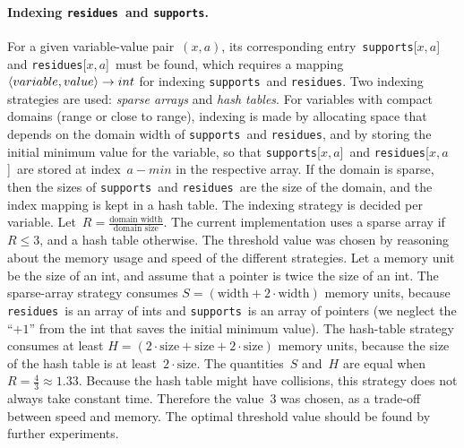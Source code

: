 \documentclass[a4paper,11pt]{article}
\newcommand{\Todo}[1]{{\color{blue}#1}}
\newcommand{\CurrTable}{\texttt{validTuples}}
\newcommand{\Supports}{\texttt{supports}}
\newcommand{\Residues}{\texttt{residues}}
\numberwithin{equation}{section}
\begin{document}
\paragraph{Indexing \Residues~and \Supports.}
For a given variable-value pair~$(x,a)$, its corresponding entry~\Supports[$x,a$]
and \Residues[$x,a$]~must be found, which requires a mapping
$\left\langle variable,value\right\rangle \to int$ for indexing \Supports~and \Residues.
Two indexing strategies are used: \emph{sparse arrays} and \emph{hash tables}.
For variables with compact domains (range or close to range),
indexing is made by allocating space that depends on the domain width of
\Supports~and \Residues, and by storing the initial minimum value for the variable,
so that \Supports[$x,a$]~and \Residues[$x,a$]~are stored at index~$a - min$ in
the respective array. If the domain is sparse,
then the sizes of \Supports~and \Residues~are the size of the domain, and the index mapping
is kept in a hash table.
The indexing strategy is decided per variable.
Let~$R = \frac{\text{domain width}}{\text{domain size}}$.
The current implementation uses a sparse array if~$R \leq 3$, and a hash table
otherwise.
The threshold value was chosen by reasoning about the memory usage and speed
of the different strategies.
Let a memory unit be the size of an int, and assume that a pointer is twice
the size of an int. The sparse-array 
strategy consumes $S = (\text{width} + 2 \cdot \text{width})$ memory units,
because \Residues~is an array of ints and \Supports~is an array of pointers
(we neglect the ``$+1$'' from the int that saves the initial minimum value).
The hash-table strategy consumes at least
$H = (2 \cdot \text{size} + \text{size} + 2 \cdot \text{size})$
memory units, because the size of the hash table 
is at least~$2 \cdot \text{size}$.
The quantities~$S$ and~$H$ are equal when~$R = \frac{4}{3} \approx 1.33$.
Because the hash table might have collisions, this strategy does not always
take constant time. Therefore the value~$3$ was chosen, as a trade-off between
speed and memory. The optimal threshold value should be found by further
experiments.

\end{document}

